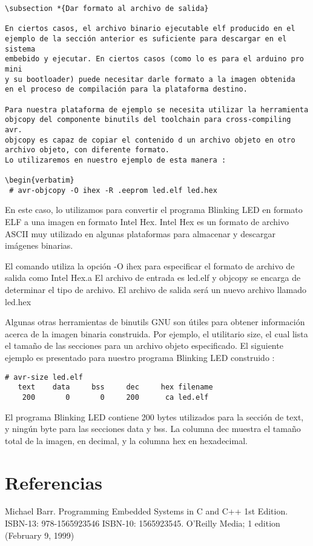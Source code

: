 \documentclass[12pt]{article}
\begin{document}
\begin{verbatim}
\subsection *{Dar formato al archivo de salida}

En ciertos casos, el archivo binario ejecutable elf producido en el 
ejemplo de la sección anterior es suficiente para descargar en el sistema 
embebido y ejecutar. En ciertos casos (como lo es para el arduino pro mini
y su bootloader) puede necesitar darle formato a la imagen obtenida
en el proceso de compilación para la plataforma destino.

Para nuestra plataforma de ejemplo se necesita utilizar la herramienta
objcopy del componente binutils del toolchain para cross-compiling avr. 
objcopy es capaz de copiar el contenido d un archivo objeto en otro 
archivo objeto, con diferente formato.
Lo utilizaremos en nuestro ejemplo de esta manera :

\begin{verbatim}
 # avr-objcopy -O ihex -R .eeprom led.elf led.hex
\end{verbatim}

En este caso, lo utilizamos para convertir el programa Blinking LED 
en formato ELF a una imagen en formato Intel Hex. Intel Hex 
es un formato de archivo ASCII muy utilizado en algunas plataformas
para almacenar y descargar imágenes binarias.

El comando utiliza la opción -O ihex para especificar el formato 
de archivo de salida como Intel Hex.a El archivo de entrada es led.elf
y objcopy se encarga de determinar el tipo de archivo. El archivo de salida
será un nuevo archivo llamado led.hex

Algunas otras herramientas de binutils GNU son útiles para obtener 
información acerca de la imagen binaria construida.
Por ejemplo, el utilitario size, el cual lista el tamaño de las secciones
para un archivo objeto especificado. El siguiente ejemplo es presentado
para nuestro programa Blinking LED construido :

\begin{verbatim}
# avr-size led.elf
   text	   data	    bss	    dec	    hex	filename
    200	      0	      0	    200	     ca	led.elf
\end{verbatim}

El programa Blinking LED contiene 200 bytes utilizados para la sección de text, y
ningún byte para las secciones data y bss. La columna dec muestra el tamaño
total de la imagen, en decimal, y la columna hex en hexadecimal.





\section*{Referencias}

Michael Barr. Programming Embedded Systems in C and C++ 1st Edition. ISBN-13: 978-1565923546
ISBN-10: 1565923545. O'Reilly Media; 1 edition (February 9, 1999)



\end{document}

